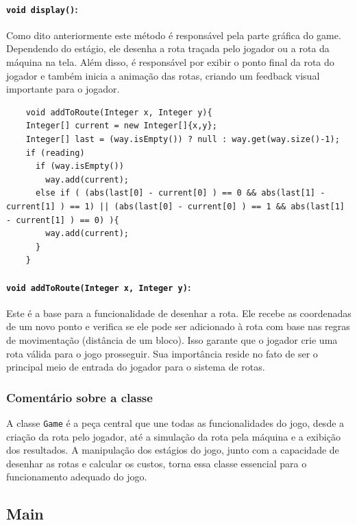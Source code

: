 \documentclass[
	12pt,				%
	oneside,			%
	a4paper,			%
	english,			%
	brazil,				%
	]{abntex2}
\begin{document}
{\paragraph{\texttt{void display()}:}
Como dito anteriormente este método é responsável pela parte gráfica do game. Dependendo do estágio, ele desenha a rota traçada pelo jogador ou a rota da máquina na tela. Além disso, é responsável por exibir o ponto final da rota do jogador e também inicia a animação das rotas, criando um feedback visual importante para o jogador.

\begin{lstlisting}
    void addToRoute(Integer x, Integer y){
    Integer[] current = new Integer[]{x,y};
    Integer[] last = (way.isEmpty()) ? null : way.get(way.size()-1);
    if (reading)
      if (way.isEmpty())
        way.add(current);
      else if ( (abs(last[0] - current[0] ) == 0 && abs(last[1] - current[1] ) == 1) || (abs(last[0] - current[0] ) == 1 && abs(last[1] - current[1] ) == 0) ){
        way.add(current);
      }
    }
\end{lstlisting}

\paragraph{\texttt{void addToRoute(Integer x, Integer y)}:}
Este é a base para a funcionalidade de desenhar a rota. Ele recebe as coordenadas de um novo ponto e verifica se ele pode ser adicionado à rota com base nas regras de movimentação (distância de um bloco). Isso garante que o jogador crie uma rota válida para o jogo prosseguir. Sua importância reside no fato de ser o principal meio de entrada do jogador para o sistema de rotas.


\subsubsection{Comentário sobre a classe}
A classe \texttt{Game} é a peça central que une todas as funcionalidades do jogo, desde a criação da rota pelo jogador, até a simulação da rota pela máquina e a exibição dos resultados. A manipulação dos estágios do jogo, junto com a capacidade de desenhar as rotas e calcular os custos, torna essa classe essencial para o funcionamento adequado do jogo.

\subsection{Main}

}
\end{document}
